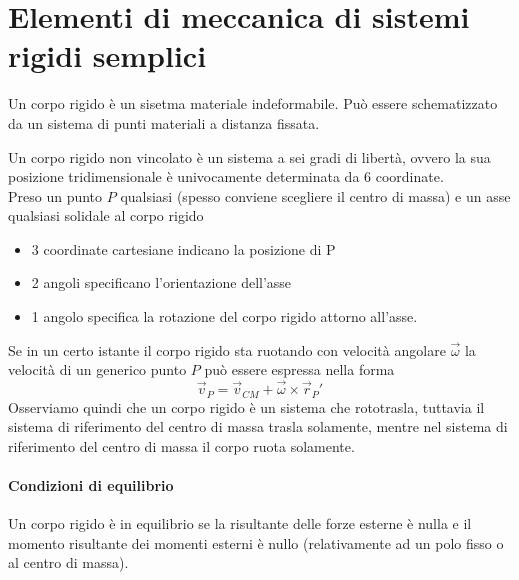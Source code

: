 \documentclass{article}
\theoremstyle{plain}
\begin{document}
\section{Elementi di meccanica di sistemi rigidi semplici}
\begin{boxdef}
    Un corpo rigido è un sisetma materiale indeformabile. Può essere schematizzato da un sistema di punti materiali a distanza fissata.
\end{boxdef}
Un corpo rigido non vincolato è un sistema a sei gradi di libertà, ovvero la sua posizione tridimensionale è univocamente determinata da 6 coordinate.
\\
Preso un punto $P$ qualsiasi (spesso conviene scegliere il centro di massa) e un asse qualsiasi solidale al corpo rigido\begin{itemize}
    \item 3 coordinate cartesiane indicano la posizione di P
    \item 2 angoli specificano l'orientazione dell'asse
    \item 1 angolo specifica la rotazione del corpo rigido attorno all'asse.
\end{itemize}

Se in un certo istante il corpo rigido sta ruotando con velocità angolare $\vec\omega$ la velocità di un generico punto $P$ può essere espressa nella forma 
\[\vec v_P =\vec v_{CM} +\vec\omega \times \vec r_{P}'\]
Osserviamo quindi che un corpo rigido è un sistema che rototrasla, tuttavia il sistema di riferimento del centro di massa trasla solamente, mentre nel sistema di riferimento del centro di massa il corpo ruota solamente.
\paragraph{Condizioni di equilibrio}
Un corpo rigido è in equilibrio se la risultante delle forze esterne è nulla e il momento risultante dei momenti esterni è nullo (relativamente ad un polo fisso o al centro di massa).
\end{document}
